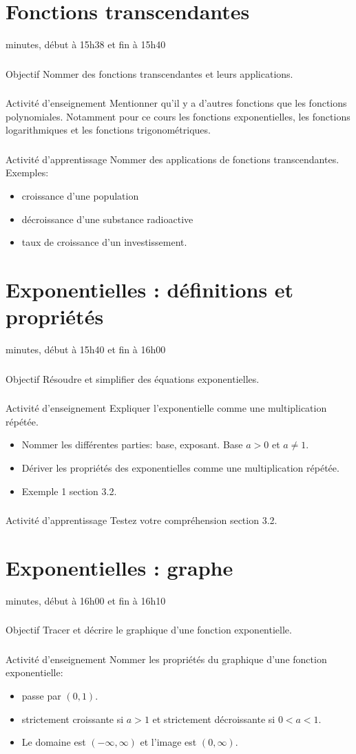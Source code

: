\documentclass[12pt]{article}
\newcommand\mysection[1]{\section{\sffamily #1}}
\newcommand\mysubsubsection[1]{\subsubsection{\sffamily #1}}
\begin{document}
\clearpage
\mysection{Fonctions transcendantes}
 minutes, début à 15h38 et fin à 15h40
\mysubsubsection*{\faBullseye{} Objectif}
Nommer des fonctions transcendantes et leurs applications.
\mysubsubsection*{\faChalkboardTeacher{} Activité d'enseignement}
Mentionner qu'il y a d'autres fonctions que les fonctions polynomiales. Notamment pour ce cours les fonctions exponentielles, les fonctions logarithmiques et les fonctions trigonométriques.
\mysubsubsection*{\faCalculator{} Activité d'apprentissage}
Nommer des applications de fonctions transcendantes. Exemples: 
\begin{itemize}
\item croissance d'une population
\item décroissance d'une substance radioactive
\item taux de croissance d'un investissement.
\end{itemize}



\clearpage
\mysection{Exponentielles : définitions et propriétés}
 minutes, début à 15h40 et fin à 16h00
\mysubsubsection*{\faBullseye{} Objectif}
Résoudre et simplifier des équations exponentielles.
\mysubsubsection*{\faChalkboardTeacher{} Activité d'enseignement}
Expliquer l'exponentielle comme une multiplication répétée.
\begin{itemize}
\item Nommer les différentes parties: base, exposant. Base $a > 0$ et $a \neq 1$.
\item Dériver les propriétés des exponentielles comme une multiplication répétée.
\item Exemple 1 section 3.2.
\end{itemize}

\mysubsubsection*{\faCalculator{} Activité d'apprentissage}
Testez votre compréhension section 3.2.


\clearpage
\mysection{Exponentielles : graphe}
 minutes, début à 16h00 et fin à 16h10
\mysubsubsection*{\faBullseye{} Objectif}
Tracer et décrire le graphique d'une fonction exponentielle.
\mysubsubsection*{\faChalkboardTeacher{} Activité d'enseignement}
Nommer les propriétés du graphique d'une fonction exponentielle: 
\begin{itemize}
\item passe par $(0,1)$.
\item strictement croissante si $a > 1$ et strictement décroissante si $0 < a < 1$.
\item Le domaine est $(-\infty, \infty)$ et l'image est $(0, \infty)$.
\end{itemize}
\end{document}
